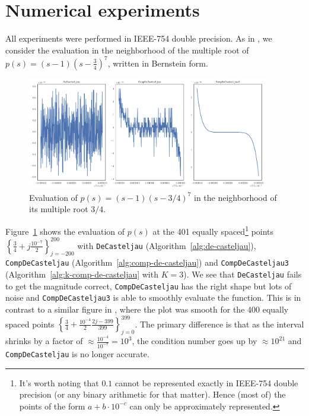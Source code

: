 \documentclass[letterpaper,10pt]{article}
\theoremstyle{definition}
\begin{document}
\section{Numerical experiments}\label{sec:numerical}

All experiments were performed in IEEE-754 double precision.
As in \cite{Jiang2010}, we consider the evaluation in the neighborhood
of the multiple root of \(p(s) = (s - 1)\left(s - \frac{3}{4}\right)^7\),
written in Bernstein form.

\begin{figure}
  \includegraphics[width=0.9375\textwidth]{../images/de_casteljau_smooth_drawing.pdf}
  \centering
  \captionsetup{width=.75\linewidth}
  \caption{Evaluation of \(p(s) = (s - 1)\left(s - 3/4\right)^7\)
    in the neighborhood of its multiple root \(3/4\).}
  \label{fig:smooth-drawing}
\end{figure}

Figure~\ref{fig:smooth-drawing} shows the evaluation of \(p(s)\) at
the 401 equally spaced\footnote{It's worth noting that \(0.1\) cannot
be represented exactly in IEEE-754 double precision (or any binary
arithmetic for that matter). Hence (most of) the points of the form
\(a + b \cdot 10^{-c}\) can only be approximately represented.} points
\(\left\{\frac{3}{4} + j \frac{10^{-7}}{2}\right\}_{j=-200}^{200}\)
with \texttt{DeCasteljau} (Algorithm~\ref{alg:de-casteljau}),
\texttt{CompDeCasteljau} (Algorithm~\ref{alg:comp-de-casteljau})
and \texttt{CompDeCasteljau3} (Algorithm~\ref{alg:k-comp-de-casteljau}
with \(K = 3\)). We see that \texttt{DeCasteljau} fails to get the
magnitude correct, \texttt{CompDeCasteljau} has the right shape but
lots of noise and \texttt{CompDeCasteljau3} is able to smoothly evaluate
the function. This is in contrast to a similar figure in \cite{Jiang2010},
where the plot was smooth for the 400 equally spaced points
\(\left\{\frac{3}{4} + \frac{10^{-4}}{2} \frac{2j - 399}{399}
\right\}_{j=0}^{399}\). The primary difference is that as the interval
shrinks by a factor of \(\approx \frac{10^{-4}}{10^{-7}} = 10^3\), the
condition number goes up by \(\approx 10^{21}\) and \texttt{CompDeCasteljau}
is no longer accurate.
\end{document}
